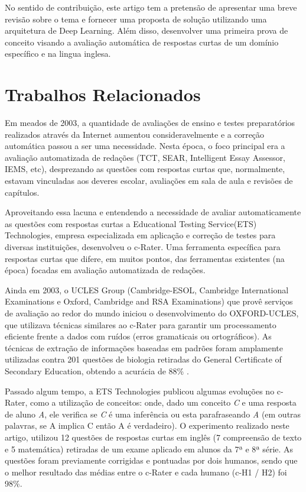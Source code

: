 \documentclass[conference]{IEEEtran}
\begin{document}
No sentido de contribuição, este artigo  tem a pretensão de apresentar uma breve revisão sobre o tema e fornecer uma proposta de solução utilizando uma arquitetura de Deep Learning. Além disso, desenvolver uma primeira prova de conceito visando a avaliação automática de respostas curtas de um domínio específico e na lingua inglesa.


\section{Trabalhos Relacionados}
Em meados de 2003, a quantidade de avaliações de ensino e testes preparatórios realizados através da Internet aumentou consideravelmente e a correção automática passou a ser uma necessidade. Nesta época, o foco principal era a avaliação automatizada de redações (TCT\cite{Larkey:1998}, SEAR\cite{Christie:1999}, Intelligent Essay Assessor\cite{Foltz:2003}, IEMS\cite{Ming:2000}, etc), desprezando as questões com respostas curtas que, normalmente, estavam vinculadas aos deveres escolar, avaliações em sala de aula e revisões de capítulos\cite{Leacock:2003}.

Aproveitando essa lacuna e entendendo a necessidade de avaliar automaticamente as questões com respostas curtas a Educational Testing Service(ETS) Technologies, empresa especializada em aplicação e correção de testes para diversas instituições, desenvolveu o c-Rater. Uma ferramenta específica para respostas curtas que difere, em muitos pontos, das ferramentas existentes (na época) focadas em avaliação automatizada de redações\cite{Leacock:2003}.

Ainda em 2003, o UCLES Group (Cambridge-ESOL, Cambridge International Examinations e Oxford, Cambridge and RSA Examinations) que provê serviços de avaliação ao redor do mundo iniciou o desenvolvimento do OXFORD-UCLES, que utilizava técnicas similares ao c-Rater para garantir um processamento eficiente frente a dados com ruídos (erros gramaticais ou ortográficos). As técnicas de extração de informações baseadas em padrões foram amplamente utilizadas contra 201 questões de biologia retiradas do General Certificate of Secondary Education, obtendo a acurácia de 88\% \cite{Sukkarieh:2003}.

Passado algum tempo, a ETS Technologies publicou algumas evoluções no c-Rater, como a utilização de conceitos: onde, dado um conceito \textit{C} e uma resposta de aluno \textit{A}, ele verifica se \textit{C} é uma inferência ou esta parafraseando \textit{A} (em outras palavras, se A implica C então A é verdadeiro)\cite{Sukkarieh:2009}. O experimento realizado neste artigo, utilizou 12 questões de respostas curtas em inglês (7 compreensão de texto e 5 matemática) retiradas de um exame aplicado em alunos da 7ª e 8ª série. As questões foram previamente corrigidas e pontuadas por dois humanos, sendo que o melhor resultado das médias entre o c-Rater e cada humano (c-H1 / H2) foi 98\%.
\end{document}
